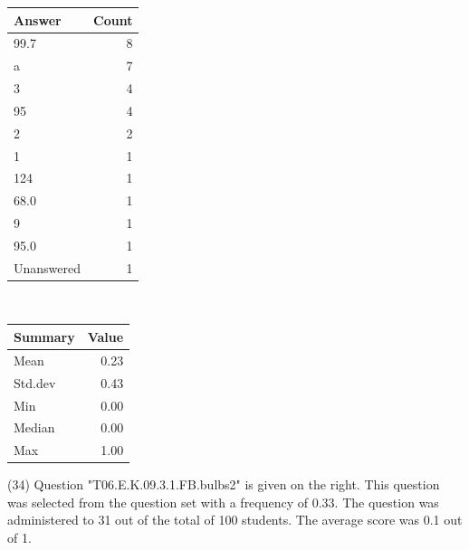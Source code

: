\documentclass[12pt,nohyper]{tufte-handout}\usepackage[]{graphicx}\usepackage[]{color}
\begin{document}
\begin{center}%
\begin{tabular}{lr}
  \hline
Answer & Count \\ 
  \hline
99.7 &   8 \\ 
  a &   7 \\ 
  3 &   4 \\ 
  95 &   4 \\ 
  2 &   2 \\ 
  1 &   1 \\ 
  124 &   1 \\ 
  68.0 &   1 \\ 
  9 &   1 \\ 
  95.0 &   1 \\ 
  Unanswered &   1 \\ 
   \hline
\end{tabular}
~~~~~~~~%
\begin{tabular}{lr}
  \hline
Summary & Value \\ 
  \hline
Mean & 0.23 \\ 
  Std.dev & 0.43 \\ 
  Min & 0.00 \\ 
  Median & 0.00 \\ 
  Max & 1.00 \\ 
   \hline
\end{tabular}
\end{center}\newpage{} (34) Question "T06.E.K.09.3.1.FB.bulbs2" is given on the right. This question was selected from the question set with a frequency of 0.33. The question was administered to 31 out of the total of 100 students. The average score was 0.1 out of 1.
\end{document}

